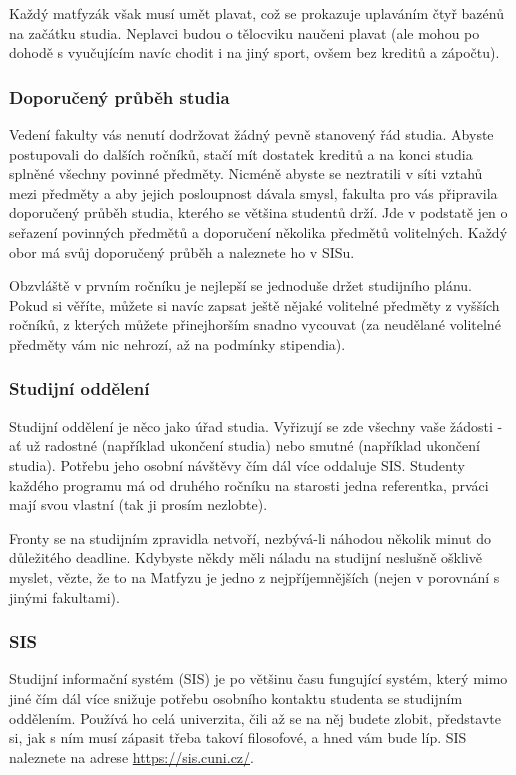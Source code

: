 Každý matfyzák však musí umět plavat, což se prokazuje uplaváním čtyř bazénů na
začátku studia. Neplavci budou o tělocviku naučeni plavat (ale mohou po dohodě s
vyučujícím navíc chodit i na jiný sport, ovšem bez kreditů a zápočtu).

\subsubsection{Doporučený průběh studia}
Vedení fakulty vás nenutí dodržovat žádný pevně stanovený řád studia. Abyste
postupovali do dalších ročníků, stačí mít dostatek kreditů a na konci studia
splněné všechny povinné předměty. Nicméně abyste se neztratili v síti vztahů
mezi předměty a aby jejich posloupnost dávala smysl, fakulta pro vás připravila
doporučený průběh studia, kterého se většina studentů drží. Jde v podstatě jen o
seřazení povinných předmětů a doporučení několika předmětů volitelných. Každý
obor má svůj doporučený průběh a naleznete ho v SISu.

Obzvláště v prvním ročníku je nejlepší se jednoduše držet studijního plánu.
Pokud si věříte, můžete si navíc zapsat ještě nějaké volitelné předměty z
vyšších ročníků, z kterých můžete přinejhorším snadno vycouvat (za neudělané
volitelné předměty vám nic nehrozí, až na podmínky stipendia).


\subsubsection{Studijní oddělení}
Studijní oddělení je něco jako úřad studia. Vyřizují se zde všechny vaše žádosti
- ať už radostné (například ukončení studia) nebo smutné (například ukončení
studia). Potřebu jeho osobní návštěvy čím dál více oddaluje SIS. Studenty
každého programu má od druhého ročníku na starosti jedna referentka, prváci mají
svou vlastní (tak ji prosím nezlobte).

Fronty se na studijním zpravidla netvoří, nezbývá-li náhodou několik minut do
důležitého deadline. Kdybyste někdy měli náladu na studijní neslušně ošklivě
myslet, vězte, že to na Matfyzu je jedno z nejpříjemnějších (nejen v porovnání s
jinými fakultami).


\subsubsection{SIS}
Studijní informační systém (SIS) je po většinu času fungující systém, který mimo
jiné čím dál více snižuje potřebu osobního kontaktu studenta se studijním
oddělením. Používá ho celá univerzita, čili až se na něj budete zlobit,
představte si, jak s ním musí zápasit třeba takoví filosofové, a hned vám bude
líp. SIS naleznete na adrese \url{https://sis.cuni.cz/}.

